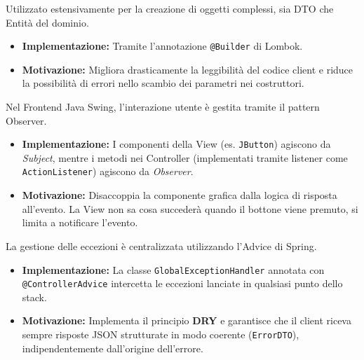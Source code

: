 \documentclass[a4paper,12pt]{article}
\begin{document}
\vspace{0.5cm}
\begin{tcolorbox}[
    enhanced,
    colback=BoxLight,
    colframe=UninaBlue,
    boxrule=0.8pt,
    arc=3pt,
    sharp corners,
    title=4. Builder Pattern (Creational Pattern),
    fonttitle=\bfseries,
    coltitle=white,
    breakable
]
Utilizzato estensivamente per la creazione di oggetti complessi, sia DTO che Entità del dominio.
\begin{itemize}
    \item \textbf{Implementazione:} Tramite l'annotazione \texttt{@Builder} di Lombok.
    \item \textbf{Motivazione:} Migliora drasticamente la leggibilità del codice client e riduce la possibilità di errori nello scambio dei parametri nei costruttori.
\end{itemize}
\end{tcolorbox}

\vspace{0.5cm}
\begin{tcolorbox}[
    enhanced,
    colback=BoxLight,
    colframe=UninaBlue,
    boxrule=0.8pt,
    arc=3pt,
    sharp corners,
    title=5. Observer Pattern (Event Handling),
    fonttitle=\bfseries,
    coltitle=white,
    breakable
]
Nel Frontend Java Swing, l'interazione utente è gestita tramite il pattern Observer.
\begin{itemize}
    \item \textbf{Implementazione:} I componenti della View (es. \texttt{JButton}) agiscono da \textit{Subject}, mentre i metodi nei Controller (implementati tramite listener come \texttt{ActionListener}) agiscono da \textit{Observer}.
    \item \textbf{Motivazione:} Disaccoppia la componente grafica dalla logica di risposta all'evento. La View non sa cosa succederà quando il bottone viene premuto, si limita a notificare l'evento.
\end{itemize}
\end{tcolorbox}

\vspace{0.5cm}
\begin{tcolorbox}[
    enhanced,
    colback=BoxLight,
    colframe=UninaBlue,
    boxrule=0.8pt,
    arc=3pt,
    sharp corners,
    title=6. Strategy Pattern (Global Exception Handler),
    fonttitle=\bfseries,
    coltitle=white,
    breakable
]
La gestione delle eccezioni è centralizzata utilizzando l'Advice di Spring.
\begin{itemize}
    \item \textbf{Implementazione:} La classe \texttt{GlobalExceptionHandler} annotata con \texttt{@ControllerAdvice} intercetta le eccezioni lanciate in qualsiasi punto dello stack.
    \item \textbf{Motivazione:} Implementa il principio \textbf{DRY} e garantisce che il client riceva sempre risposte JSON strutturate in modo coerente (\texttt{ErrorDTO}), indipendentemente dall'origine dell'errore.
\end{itemize}
\end{tcolorbox}
\end{document}
